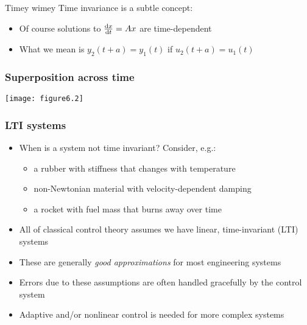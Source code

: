 \documentclass{beamer-control}
\begin{document}

\begin{frame}{Timey wimey}
Time invariance is a subtle concept:
\begin{itemize}
\item Of course solutions to $\frac{\mathrm{d} x}{\mathrm{d} t} = Ax$ are time-dependent
\item What we mean is $y_2(t+a) = y_1 (t)$ if $u_2(t+a) = u_1 (t)$
\end{itemize}
\end{frame}

\begin{frame}
\frametitle{Superposition across time}

\texttt{[image: figure6.2]}


\end{frame}

\begin{frame}
\frametitle{LTI systems}
\begin{itemize}
\item When is a system not time invariant? Consider, e.g.:
\begin{itemize}
\item a rubber with stiffness that changes with temperature
\item non-Newtonian material with velocity-dependent damping
\item a rocket with fuel mass that burns away over time
\end{itemize}
\item All of classical control theory assumes we have linear, time-invariant (LTI) systems
\item These are generally \emph{good approximations} for most engineering systems
\item Errors due to these assumptions are often handled gracefully by the control system
\item Adaptive and/or nonlinear control is needed for more complex systems
\end{itemize}
\end{frame}

\SUMMARYFRAME
\FINALE
\end{document}
